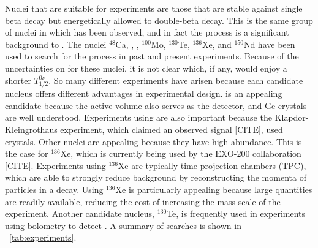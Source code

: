 Nuclei that are suitable for \zvbb experiments are those that are stable against single beta decay but energetically allowed to double-beta decay.  This is the same group of nuclei in which \tvbb has been observed, and in fact the \tvbb process is a significant background to \zvbb.  The nuclei $^{48}$Ca, , , $^{100}$Mo, $^{130}$Te, $^{136}$Xe, and $^{150}$Nd have been used to search for the process in past and present experiments.  Because of the uncertainties on \NME for these nuclei, it is not clear which, if any, would enjoy a shorter $T^{0\nu}_{1/2}$.  So many different experiments have arisen because each candidate nucleus offers different advantages in experimental design.   is an appealing candidate because the active volume also serves as the detector, and Ge crystals are well understood.  Experiments using  are also important because the Klapdor-Kleingrothaus experiment, which claimed an observed \zvbb signal [CITE], used  crystals.  Other nuclei are appealing because they have high abundance.  This is the case for $^{136}$Xe, which is currently being used by the EXO-200 collaboration [CITE].  Experiments using $^{136}$Xe are typically time projection chambers (TPC), which are able to strongly reduce background by reconstructing the momenta of particles in a decay.  Using $^{136}$Xe is particularly appealing because large quantities are readily available, reducing the cost of increasing the mass scale of the experiment.  Another candidate nucleus, $^{130}$Te, is frequently used in experiments using bolometry to detect \zvbb.  A summary of \zvbb searches is shown in {\tab}~\ref{tab:experiments}.

